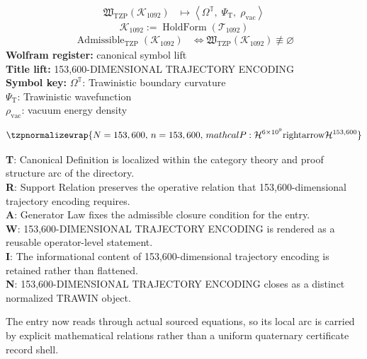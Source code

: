 \noindent
\begin{minipage}[t]{0.48\linewidth}
\begingroup
\small
\[
\begin{aligned}
\mathfrak{W}_{\mathrm{TZP}}\!\left(\mathcal{K}_{1092}\right)
&\longmapsto
\left\langle \Omega^{\mathbb{T}},\; \Psi_{\mathrm{T}},\; \rho_{\mathrm{vac}} \right\rangle
\end{aligned}
\]
\[
\mathcal{K}_{1092}
:=
\operatorname{HoldForm}\!\left(\mathcal{T}_{1092}\right)
\]
\[
\begin{aligned}
\operatorname{Admissible}_{\mathrm{TZP}}\!\left(\mathcal{K}_{1092}\right)
&\Longleftrightarrow
\mathfrak{W}_{\mathrm{TZP}}\!\left(\mathcal{K}_{1092}\right)\not\equiv\varnothing
\end{aligned}
\]
\textbf{Wolfram register:} canonical symbol lift\\
\textbf{Title lift:} 153,600-DIMENSIONAL TRAJECTORY ENCODING\\
\textbf{Symbol key:} \(\Omega^{\mathbb{T}}\): Trawinistic boundary curvature\\ \(\Psi_{\mathrm{T}}\): Trawinistic wavefunction\\ \(\rho_{\mathrm{vac}}\): vacuum energy density
\par
\endgroup
\end{minipage}\hfill
\begin{minipage}[t]{0.48\linewidth}
\[
\tzpnormalizewrap{N=153,600,\,n=153,600,\,mathcal{P}:\mathcal{H}^{6\times 10^{9}}\mathrm{rightarrow}\mathcal{H}^{153,600}}
\]

\small
\textbf{T}: Canonical Definition is localized within the category theory and proof structure arc of the directory.\\
\textbf{R}: Support Relation preserves the operative relation that 153,600-dimensional trajectory encoding requires.\\
\textbf{A}: Generator Law fixes the admissible closure condition for the entry.\\
\textbf{W}: 153,600-DIMENSIONAL TRAJECTORY ENCODING is rendered as a reusable operator-level statement.\\
\textbf{I}: The informational content of 153,600-dimensional trajectory encoding is retained rather than flattened.\\
\textbf{N}: 153,600-DIMENSIONAL TRAJECTORY ENCODING closes as a distinct normalized TRAWIN object.
\normalsize
\end{minipage}

The entry now reads through actual sourced equations, so its local arc is carried by explicit mathematical relations rather than a uniform quaternary certificate record shell.
\clearpage

